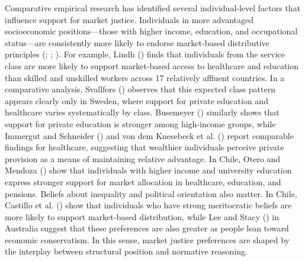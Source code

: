 \documentclass[
  12pt,
]{article}
\begin{document}
Comparative empirical research has identified several individual-level
factors that influence support for market justice. Individuals in more
advantaged socioeconomic positions---those with higher income,
education, and occupational status---are consistently more likely to
endorse market-based distributive principles
(;
;
). For example,
Lindh () finds that individuals
from the service class are more likely to support market-based access to
healthcare and education than skilled and unskilled workers across 17
relatively affluent countries. In a comparative analysis, Svallfors
() observes that this
expected class pattern appears clearly only in Sweden, where support for
private education and healthcare varies systematically by class.
Busemeyer () similarly shows
that support for private education is stronger among high-income groups,
while Immergut and Schneider () and
von dem Knesebeck et al. ()
report comparable findings for healthcare, suggesting that wealthier
individuals perceive private provision as a means of maintaining
relative advantage. In Chile, Otero and Mendoza
() show that individuals with
higher income and university education express stronger support for
market allocation in healthcare, education, and pensions. Beliefs about
inequality and political orientation also matter. In Chile, Castillo et
al. () show that
individuals who have strong meritocratic beliefs are more likely to
support market-based distribution, while Lee and Stacy
() in Australia suggest that these
preferences are also greater as people lean toward economic
conservatism. In this sense, market justice preferences are shaped by
the interplay between structural position and normative reasoning.
\end{document}
